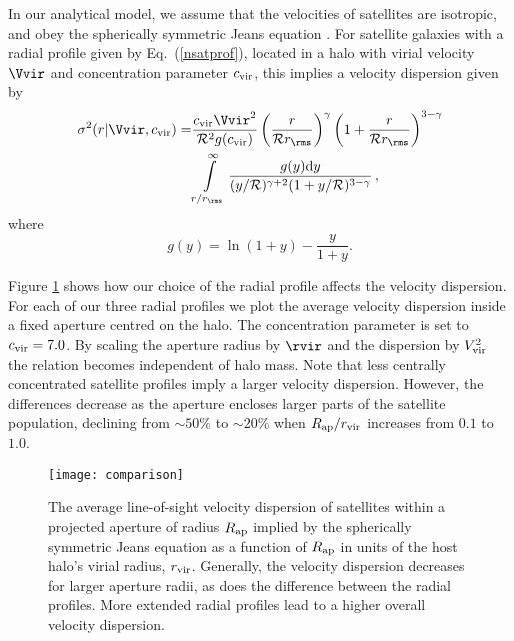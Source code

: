 \documentclass[fleqn,usenatbib,useAMS]{mnras}
\begin{document}
	In our analytical model, we assume that the velocities of satellites are isotropic, and obey the spherically symmetric Jeans equation \citep[][]{Binney+87}. For satellite galaxies with a radial profile given by Eq.~(\ref{nsatprof}), located in a halo with virial velocity $\Vvir$ and concentration parameter $c_{\rm vir}$, this implies a velocity dispersion given by
	\begin{align}
	\sigma^2 (r | \Vvir, c_{\rm vir}) =& \frac{c_{\rm vir} \Vvir^2}{\mathcal{R}^2 g(c_{\rm vir})} \left( \frac{r}{\mathcal{R} r_\rms} \right)^\gamma\left( 1 + \frac{r}{\mathcal{R} r_\rms} \right)^{3 - \gamma} \nonumber\\
	& \int\limits_{r / r_\rms}^{\infty} \frac{g(y)\mathrm{d}y}{(y / \mathcal{R})^{\gamma + 2} (1 + y / \mathcal{R})^{3 - \gamma}}\,,
	\label{eq:Jeans}
	\end{align}
	where
	\begin{equation}
	g(y) = \ln (1 + y) - \frac{y}{1 + y}.
	\end{equation}
	
	Figure \ref{fig:profile_vs_dispersion} shows how our choice of the radial profile affects the velocity dispersion. For each of our three radial profiles we plot the average velocity dispersion inside a fixed aperture centred on the halo. The concentration parameter is set to $c_{\rm vir} = 7.0$. By scaling the aperture radius by $\rvir$ and the dispersion by $V_{\rm vir}^2$ the relation becomes independent of halo mass. Note that less centrally concentrated satellite profiles imply a larger velocity dispersion. However, the differences decrease as the aperture encloses larger parts of the satellite population, declining from $\sim 50\%$ to $\sim 20\%$ when $R_{\rm ap} / r_{\rm vir}$ increases from $0.1$ to $1.0$.
	\begin{figure}
		\centering
		\texttt{[image: comparison]}
		\caption{The average line-of-sight velocity dispersion of satellites within a projected aperture of radius $R_{\rm ap}$ implied by the spherically symmetric Jeans equation as a function of $R_{\rm ap}$ in units of the host halo's virial radius, $r_{\rm vir}$. Generally, the velocity dispersion decreases for larger aperture radii, as does the difference between the radial profiles. More extended radial profiles lead to a higher overall velocity dispersion.}
		\label{fig:profile_vs_dispersion}
	\end{figure}
	
\end{document}
